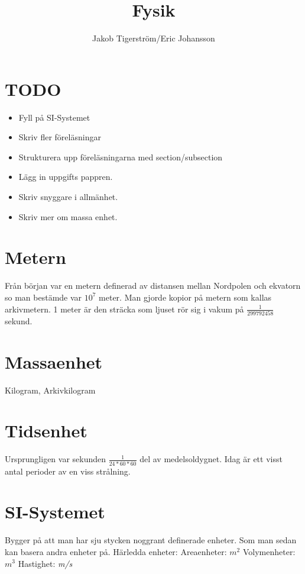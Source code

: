 \documentclass[a4paper,11pt]{article}
\title{Fysik}
\author{Jakob Tigerström/Eric Johansson}
\begin{document}
\maketitle
\tableofcontents
\newpage
\begin{flushleft}
\section{TODO}
\begin{itemize}
  \item Fyll på SI-Systemet
  \item Skriv fler föreläsningar
  \item Strukturera upp föreläsningarna med section/subsection
  \item Lägg in uppgifts pappren.
  \item Skriv snyggare i allmänhet.
  \item Skriv mer om massa enhet.
\end{itemize}
\section{Metern}
Från början var en metern definerad av distansen mellan Nordpolen och ekvatorn so man bestämde var $ 10^7 $ meter.
Man gjorde kopior på metern som kallas arkivmetern.
1 meter är den sträcka som ljuset rör sig i vakum på $ \frac{1}{299792458} $ sekund.
\newline
\newline
\section{Massaenhet}
Kilogram, Arkivkilogram
\newline
\newline
\section{Tidsenhet}
Ursprungligen var sekunden $ \frac{1}{24*60*60} $ del av medelsoldygnet.
\newline
Idag är ett visst antal perioder av en viss strålning.
\newline
\newline
\section{SI-Systemet}
Bygger på att man har sju stycken noggrant definerade enheter. Som man sedan kan basera andra enheter på.
\newline
Härledda enheter:\newline
Areaenheter: $ m^2 $\newline
Volymenheter: $ m^3 $\newline
Hastighet:  \textit{m/s}\newline


\end{flushleft}
\end{document}
